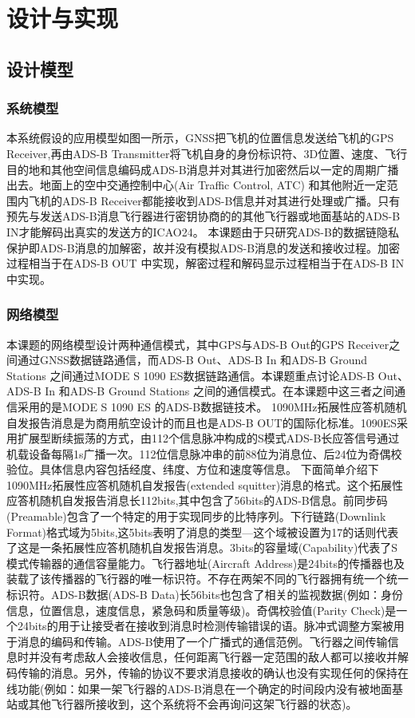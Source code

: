 
\chapter{设计与实现}

\section{设计模型}

\subsection{系统模型}
本系统假设的应用模型如图一所示，GNSS把飞机的位置信息发送给飞机的GPS Receiver,再由ADS-B Transmitter将飞机自身的身份标识符、3D位置、速度、飞行目的地和其他空间信息编码成ADS-B消息并对其进行加密然后以一定的周期广播出去。地面上的空中交通控制中心(Air Traffic Control, ATC) 和其他附近一定范围内飞机的ADS-B Receiver都能接收到ADS-B信息并对其进行处理或广播。只有预先与发送ADS-B消息飞行器进行密钥协商的的其他飞行器或地面基站的ADS-B IN才能解码出真实的发送方的ICAO24。
本课题由于只研究ADS-B的数据链隐私保护即ADS-B消息的加解密，故并没有模拟ADS-B消息的发送和接收过程。加密过程相当于在ADS-B OUT 中实现，解密过程和解码显示过程相当于在ADS-B IN中实现。

\subsection{网络模型}
本课题的网络模型设计两种通信模式，其中GPS与ADS-B Out的GPS Receiver之间通过GNSS数据链路通信，而ADS-B Out、ADS-B In 和ADS-B Ground Stations 之间通过MODE S 1090 ES数据链路通信。本课题重点讨论ADS-B Out、ADS-B In 和ADS-B Ground Stations 之间的通信模式。在本课题中这三者之间通信采用的是MODE S 1090 ES 的ADS-B数据链技术。
1090MHz拓展性应答机随机自发报告消息是为商用航空设计的而且也是ADS-B OUT的国际化标准。1090ES采用扩展型断续振荡的方式，由112个信息脉冲构成的S模式ADS-B长应答信号通过机载设备每隔1s广播一次。112位信息脉冲串的前88位为消息位、后24位为奇偶校验位。具体信息内容包括经度、纬度、方位和速度等信息。
下面简单介绍下1090MHz拓展性应答机随机自发报告(extended squitter)消息的格式。这个拓展性应答机随机自发报告消息长112bits,其中包含了56bits的ADS-B信息。前同步码(Preamable)包含了一个特定的用于实现同步的比特序列。下行链路(Downlink Format)格式域为5bits,这\newline 5bits表明了消息的类型—这个域被设置为17的话则代表了这是一条拓展性应答机随机自发报告消息。3bits的容量域(Capability)代表了S模式传输器的通信容量能力。飞行器地址(Aircraft Address)是24bits的传播器也及装载了该传播器的飞行器的唯一标识符。不存在两架不同的飞行器拥有统一个统一标识符。ADS-B数据(ADS-B Data)长56bits也包含了相关的监视数据(例如：身份信息，位置信息，速度信息，紧急码和质量等级)。奇偶校验值(Parity Check)是一个24bits的用于让接受者在接收到消息时检测传输错误的语。脉冲式调整方案被用于消息的编码和传输。ADS-B使用了一个广播式的通信范例。飞行器之间传输信息时并没有考虑敌人会接收信息，任何距离飞行器一定范围的敌人都可以接收并解码传输的消息。另外，传输的协议不要求消息接收的确认也没有实现任何的保持在线功能(例如：如果一架飞行器的ADS-B消息在一个确定的时间段内没有被地面基站或其他飞行器所接收到，这个系统将不会再询问这架飞行器的状态)。

